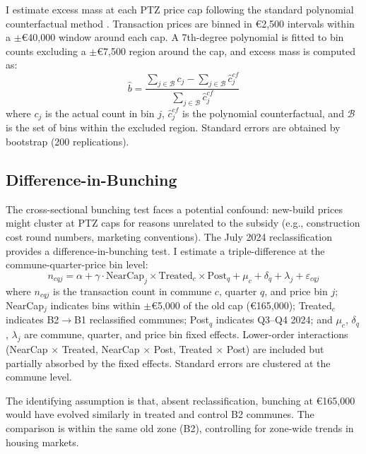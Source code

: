 \documentclass[12pt]{article}
\begin{document}
I estimate excess mass at each PTZ price cap following the standard polynomial counterfactual method \citep{chetty2011adjustment, kleven2016bunching}. Transaction prices are binned in \euro2,500 intervals within a $\pm$\euro40,000 window around each cap. A 7th-degree polynomial is fitted to bin counts excluding a $\pm$\euro7,500 region around the cap, and excess mass is computed as:
\begin{equation}
\hat{b} = \frac{\sum_{j \in \mathcal{B}} c_j - \sum_{j \in \mathcal{B}} \hat{c}_j^{cf}}{\sum_{j \in \mathcal{B}} \hat{c}_j^{cf}}
\end{equation}
where $c_j$ is the actual count in bin $j$, $\hat{c}_j^{cf}$ is the polynomial counterfactual, and $\mathcal{B}$ is the set of bins within the excluded region. Standard errors are obtained by bootstrap (200 replications).

\subsection{Difference-in-Bunching}

The cross-sectional bunching test faces a potential confound: new-build prices might cluster at PTZ caps for reasons unrelated to the subsidy (e.g., construction cost round numbers, marketing conventions). The July 2024 reclassification provides a difference-in-bunching test. I estimate a triple-difference at the commune-quarter-price bin level:
\begin{equation}
n_{cqj} = \alpha + \gamma \cdot \text{NearCap}_j \times \text{Treated}_c \times \text{Post}_q + \mu_c + \delta_q + \lambda_j + \varepsilon_{cqj}
\end{equation}
where $n_{cqj}$ is the transaction count in commune $c$, quarter $q$, and price bin $j$; NearCap$_j$ indicates bins within $\pm$\euro5,000 of the old cap (\euro165,000); Treated$_c$ indicates B2$\to$B1 reclassified communes; Post$_q$ indicates Q3--Q4 2024; and $\mu_c$, $\delta_q$, $\lambda_j$ are commune, quarter, and price bin fixed effects. Lower-order interactions (NearCap $\times$ Treated, NearCap $\times$ Post, Treated $\times$ Post) are included but partially absorbed by the fixed effects. Standard errors are clustered at the commune level.

The identifying assumption is that, absent reclassification, bunching at \euro165,000 would have evolved similarly in treated and control B2 communes. The comparison is within the same old zone (B2), controlling for zone-wide trends in housing markets.
\end{document}

